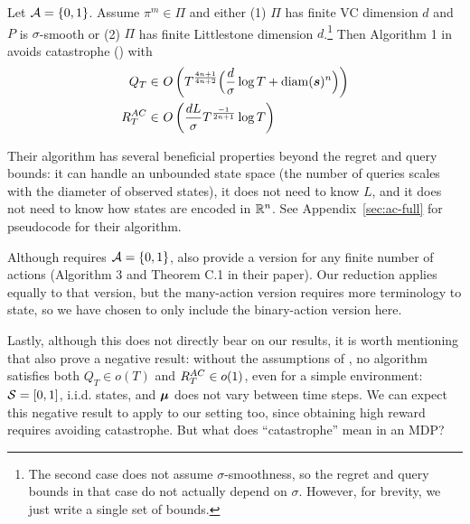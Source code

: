 \begin{lemma}
\label{lem:ac-regret}
    Let $\mathcal{A} = \{0,1\}$. Assume $\pi^m \in \Pi$ and either (1) $\Pi$ has finite VC dimension $d$ and $P$ is $\sigma$-smooth or (2) $\Pi$ has finite Littlestone dimension $d$.\footnote{The second case does not assume $\sigma$-smoothness, so the regret and query bounds in that case do not actually depend on $\sigma$. However, for brevity, we just write a single set of bounds.} Then Algorithm 1 in \citet{plaut_avoiding_2024} avoids catastrophe () with
\begin{align*}
Q_T \in&\  O\left(T^\frac{4n+1}{4n+2}\Big(\frac{d}{\sigma} \log T + \operatorname*{diam}(\boldsymbol{s})^n\Big)\right)\\
R_T^{AC} \in&\ O\left(\frac{dL}{\sigma}T^\frac{-1}{2n+1} \log T\right)
\end{align*}
\end{lemma}

Their algorithm has several beneficial properties beyond the regret and query bounds: it can handle an unbounded state space (the number of queries scales with the diameter of observed states), it does not need to know $L$, and it does not need to know how states are encoded in $\mathbb{R}^n$. See Appendix~\ref{sec:ac-full} for pseudocode for their algorithm.

Although  requires $\mathcal{A} = \{0,1\}$, \citet{plaut_avoiding_2024} also provide a version for any finite number of actions (Algorithm 3 and Theorem C.1 in their paper). Our reduction applies equally to that version, but the many-action version requires more terminology to state, so we have chosen to only include the binary-action version here.


Lastly, although this does not directly bear on our results, it is worth mentioning that \citet{plaut_avoiding_2024} also prove a negative result: without the assumptions of , no algorithm satisfies both $Q_T \in o(T)$ and $R_T^{AC} \in o(1)$, even for a simple environment: $\mathcal{S} = [0,1]$, i.i.d. states, and $\boldsymbol{\mu}$ does not vary between time steps. We can expect this negative result to apply to our setting too, since obtaining high reward requires avoiding catastrophe. But what does ``catastrophe'' mean in an MDP?


